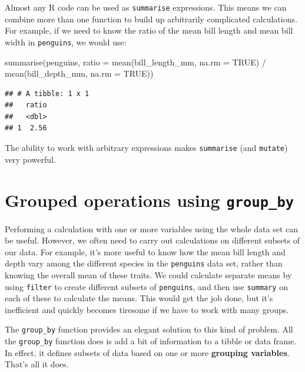 \documentclass[
]{book}
\newenvironment{Shaded}{\begin{snugshade}}{\end{snugshade}}
\newcommand{\AttributeTok}[1]{\textcolor[rgb]{0.77,0.63,0.00}{#1}}
\newcommand{\ConstantTok}[1]{\textcolor[rgb]{0.00,0.00,0.00}{#1}}
\newcommand{\FunctionTok}[1]{\textcolor[rgb]{0.00,0.00,0.00}{#1}}
\newcommand{\NormalTok}[1]{#1}
\newcommand{\SpecialCharTok}[1]{\textcolor[rgb]{0.00,0.00,0.00}{#1}}
\begin{document}
Almost any R code can be used as \texttt{summarise} expressions. This means we can combine more than one function to build up arbitrarily complicated calculations. For example, if we need to know the ratio of the mean bill length and mean bill width in \texttt{penguins}, we would use:

\begin{Shaded}
\begin{Highlighting}[]
\FunctionTok{summarise}\NormalTok{(penguins,}
  \AttributeTok{ratio =} \FunctionTok{mean}\NormalTok{(bill\_length\_mm, }\AttributeTok{na.rm =} \ConstantTok{TRUE}\NormalTok{) }\SpecialCharTok{/} \FunctionTok{mean}\NormalTok{(bill\_depth\_mm,  }\AttributeTok{na.rm =} \ConstantTok{TRUE}\NormalTok{))}
\end{Highlighting}
\end{Shaded}

\begin{verbatim}
## # A tibble: 1 x 1
##   ratio
##   <dbl>
## 1  2.56
\end{verbatim}

The ability to work with arbitrary expressions makes \texttt{summarise} (and \texttt{mutate}) very powerful.

\hypertarget{grouped-operations-using-group_by}{%
\section{\texorpdfstring{Grouped operations using \texttt{group\_by}}{Grouped operations using group\_by}}\label{grouped-operations-using-group_by}}

Performing a calculation with one or more variables using the whole data set can be useful. However, we often need to carry out calculations on different subsets of our data. For example, it's more useful to know how the mean bill length and depth vary among the different species in the \texttt{penguins} data set, rather than knowing the overall mean of these traits. We could calculate separate means by using \texttt{filter} to create different subsets of \texttt{penguins}, and then use \texttt{summary} on each of these to calculate the means. This would get the job done, but it's inefficient and quickly becomes tiresome if we have to work with many groups.

The \texttt{group\_by} function provides an elegant solution to this kind of problem. All the \texttt{group\_by} function does is add a bit of information to a tibble or data frame. In effect, it defines subsets of data based on one or more \textbf{grouping variables}. That's all it does.
\end{document}
